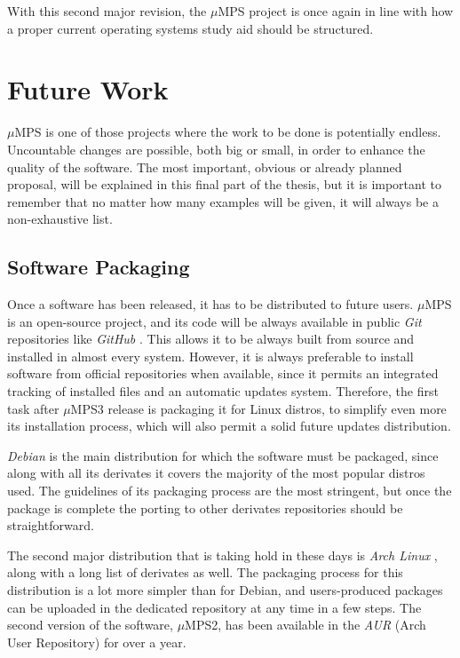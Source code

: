 \documentclass[12pt,a4paper,openright,twoside]{report}
\begin{document}
With this second major revision, the $\mu$MPS project is once again in line with how a proper current operating systems study aid should be structured.

\section{Future Work}
$\mu$MPS is one of those projects where the work to be done is potentially endless.
Uncountable changes are possible, both big or small, in order to enhance the quality of the software.
The most important, obvious or already planned proposal, will be explained in this final part of the thesis, but it is important to remember that no matter how many examples will be given, it will always be a non-exhaustive list.

\subsection{Software Packaging}
Once a software has been released, it has to be distributed to future users.
$\mu$MPS is an open-source project, and its code will be always available in public \textit{Git} \cite{git} repositories like \textit{GitHub} \cite{github}.
This allows it to be always built from source and installed in almost every system.
However, it is always preferable to install software from official repositories when available, since it permits an integrated tracking of installed files and an automatic updates system.
Therefore, the first task after $\mu$MPS3 release is packaging it for Linux distros, to simplify even more its installation process, which will also permit a solid future updates distribution.

\textit{Debian} \cite{debian} is the main distribution for which the software must be packaged, since along with all its derivates it covers the majority of the most popular distros used.
The guidelines of its packaging process are the most stringent, but once the package is complete the porting to other derivates repositories should be straightforward.

The second major distribution that is taking hold in these days is \textit{Arch Linux} \cite{arch_linux}, along with a long list of derivates as well.
The packaging process for this distribution is a lot more simpler than for Debian, and users-produced packages can be uploaded in the dedicated repository at any time in a few steps.
The second version of the software, $\mu$MPS2, has been available in the \textit{AUR} (Arch User Repository) for over a year.
\end{document}
